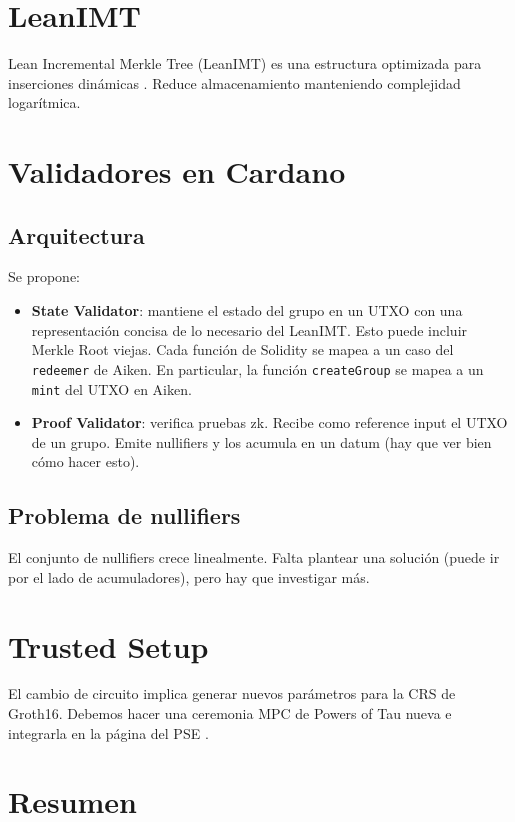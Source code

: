 \documentclass[11pt,a4paper]{article}
\begin{document}
	\section{LeanIMT}
	
	Lean Incremental Merkle Tree (LeanIMT) es una estructura optimizada para inserciones dinámicas \cite{leanimt}. Reduce almacenamiento manteniendo complejidad logarítmica.
	
	\section{Validadores en Cardano}
	
	\subsection{Arquitectura}
	
	Se propone:
	
	\begin{itemize}
		\item \textbf{State Validator}: mantiene el estado del grupo en un UTXO con una representación concisa de lo necesario del LeanIMT. Esto puede incluir Merkle Root viejas. Cada función de Solidity se mapea a un caso del \texttt{redeemer} de Aiken. En particular, la función \texttt{createGroup} se mapea a un \texttt{mint} del UTXO en Aiken.
		\item \textbf{Proof Validator}: verifica pruebas zk. Recibe como reference input el UTXO de un grupo. Emite nullifiers y los acumula en un datum (hay que ver bien cómo hacer esto).
	\end{itemize}
	
	\subsection{Problema de nullifiers}
	
	El conjunto de nullifiers crece linealmente. Falta plantear una solución (puede ir por el lado de acumuladores), pero hay  que investigar más.
	
	\section{Trusted Setup}
	
	El cambio de circuito implica generar nuevos parámetros para la CRS de Groth16. Debemos hacer una ceremonia MPC de Powers of Tau nueva e integrarla en la página del PSE \cite{powersoftau}.
	
	\section{Resumen}
	
\end{document}
